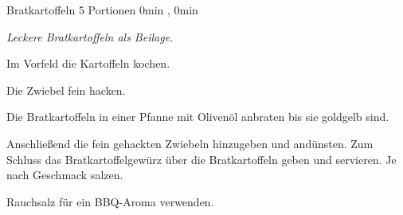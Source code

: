 \begin{recipe}{Bratkartoffeln} {5 Portionen} {0min , 0min }

  \freeform{}\textit{Leckere Bratkartoffeln als Beilage.}


  Im Vorfeld die Kartoffeln kochen.


  Die Zwiebel fein hacken.


  Die Bratkartoffeln in einer Pfanne mit Olivenöl anbraten bis sie goldgelb sind.


  Anschließend die fein gehackten Zwiebeln hinzugeben und andünsten.
  Zum Schluss das Bratkartoffelgewürz über die Bratkartoffeln geben und servieren.
  Je nach Geschmack salzen.

  \freeform{}\hrulefill{}

  \freeform{}
  Rauchsalz für ein BBQ-Aroma verwenden.

\end{recipe}
